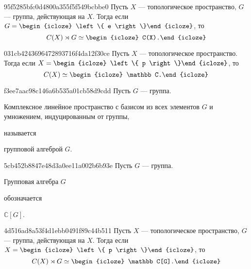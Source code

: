 \begin{note}{95f5285bfc0d4800a355f5f549bcbbe0}
    Пусть \({ X }\) --- топологическое пространство, \({ G }\) --- группа, действующая на \({ X }\).
    Тогда если \({ G = \begin{icloze}{2}\left\{ e \right\}\end{icloze} }\), то
    \[
        C(X) \rtimes G \simeq \begin{icloze}{1}C(X).\end{icloze}
    \]
\end{note}

\begin{note}{031cb4243696472893716f4da12f30ce}
    Пусть \({ X }\) --- топологическое пространство.
    Тогда если \({ X = \begin{icloze}{2}\left\{ p \right\}\end{icloze} }\), то
    \[
        C(X) \simeq \begin{icloze}{1}\mathbb C.\end{icloze}
    \]
\end{note}

\begin{note}{f3ee7aac98c146a6b535a01cb58d9cdd}
    Пусть \({ G }\) --- группа.
    \begin{icloze}{1}Комплексное линейное пространство с базисом из всех элементов \({ G }\) и умножением, индуцированным от группы,\end{icloze} называется \begin{icloze}{2}групповой алгеброй \({ G }\).\end{icloze}
\end{note}

\begin{note}{5cb452b8847e48d3a0ee11a002b6b93e}
    Пусть \({ G }\) --- группа.
    \begin{icloze}{2}Групповая алгебра \({ G }\)\end{icloze} обозначается \begin{icloze}{1}\({ \mathbb C[G] }\).\end{icloze}
\end{note}

\begin{note}{4d516ad8a53f4d1ebb0491f89c44b511}
    Пусть \({ X }\) --- топологическое пространство, \({ G }\) --- группа, действующая на \({ X }\).
    Тогда если \({ X = \begin{icloze}{2}\left\{ p \right\}\end{icloze} }\), то
    \[
        C(X) \rtimes G \simeq \begin{icloze}{1}\mathbb C[G].\end{icloze}
    \]
\end{note}


